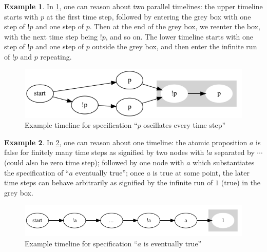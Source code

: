 \documentclass[preprint,12pt]{elsarticle}
\theoremstyle{definition}
\newtheorem{example}{Example}[section]
\theoremstyle{remark}
\begin{document}
\begin{example}
    In \cref{fig:ex2}, one can reason about two parallel timelines: the upper timeline starts with $p$ at the first time step, followed by entering the grey box with one step of $!p$ and one step of $p$. Then at the end of the grey box, we reenter the box, with the next time step being $!p$, and so on. The lower timeline starts with one step of $!p$ and one step of $p$ outside the grey box, and then enter the infinite run of $!p$ and $p$ repeating.
    \begin{figure}[!h]
        \centering
        \includegraphics[scale=0.4]{examples/ex2/ex2.png}
        \caption{Example timeline for specification ``$p$ oscillates every time step''}
        \label{fig:ex2}
    \end{figure}
\end{example}

\begin{example}
    In \cref{fig:ex15}, one can reason about one timeline: the atomic proposition $a$ is false for finitely many time steps as signified by two nodes with $!a$ separated by $\cdots$ (could also be zero time step); followed by one node with $a$ which substantiates the specification of ``$a$ eventually true''; once $a$ is true at some point, the later time steps can behave arbitrarily as signified by the infinite run of $1$ (true) in the grey box.
    \begin{figure}[!h]
        \centering
        \includegraphics[scale=0.4]{examples/ex15/ex15.png}
        \caption{Example timeline for specification ``$a$ is eventually true''}
        \label{fig:ex15}
    \end{figure}
\end{example}
\end{document}

